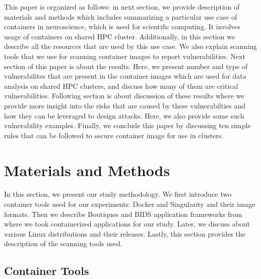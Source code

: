 \documentclass[a4paper,num-refs]{oup-contemporary}
\begin{document}
This paper is organized as follows: in next section, we provide description
of materials and methods which includes summarizing a particular use case of
containers in neuroscience, which is used for scientific computing. It involves
usage of containers on shared HPC cluster. Additionally, in this section we
describe all the resources that are used by this use case. We also explain
scanning tools that we use for scanning container images to report
vulnerabilities. Next section of this paper is about the results. Here, we
present number and type of vulnerabilites that are present in the container images
which are used for data analysis on shared HPC clusters, and discuss how many of them are
critical vulnerabilities. Following section is about discussion of these results
where we provide more insight into the risks that are caused by these vulnerabilties
and how they can be leveraged to design attacks. Here, we also provide some such
vulnerability examples. Finally, we conclude this paper by discussing ten simple
rules that can be followed to secure container image for use in clusters.

\section{Materials and Methods}

In this section, we present our study methodology. We first
introduce two container tools used for our experiments: Docker and
Singularity and their image formats. Then we describe Boutiques and BIDS application frameworks
from where we took containerized applications for our study. Later, we discuss about 
various Linux distributions and their releases. Lastly, this section
provides the description of the scanning tools used.

\subsection{Container Tools}
\end{document}
